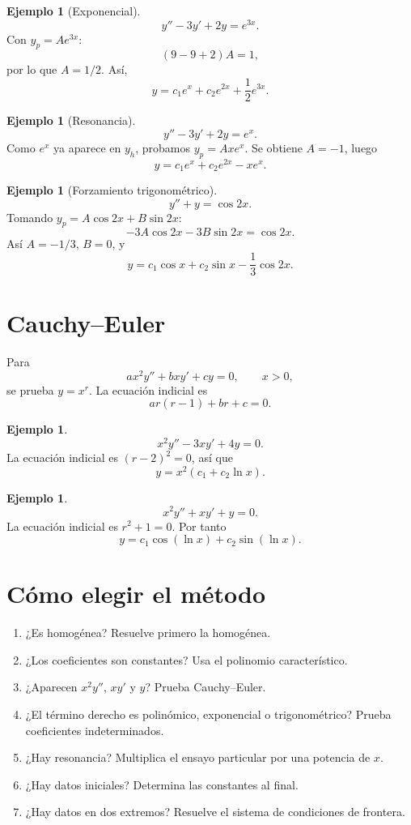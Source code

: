 \documentclass[11pt]{article}
\theoremstyle{definition}
\newtheorem{ejemplo}[teorema]{Ejemplo}
\begin{document}
\begin{ejemplo}[Exponencial]
\[
y''-3y'+2y=e^{3x}.
\]
Con $y_p=Ae^{3x}$:
\[
(9-9+2)A=1,
\]
por lo que $A=1/2$. Así,
\[
\boxed{y=c_1e^x+c_2e^{2x}+\frac12e^{3x}}.
\]
\end{ejemplo}

\begin{ejemplo}[Resonancia]
\[
y''-3y'+2y=e^x.
\]
Como $e^x$ ya aparece en $y_h$, probamos $y_p=Axe^x$. Se obtiene $A=-1$, luego
\[
\boxed{y=c_1e^x+c_2e^{2x}-xe^x}.
\]
\end{ejemplo}

\begin{ejemplo}[Forzamiento trigonométrico]
\[
y''+y=\cos2x.
\]
Tomando $y_p=A\cos2x+B\sin2x$:
\[
-3A\cos2x-3B\sin2x=\cos2x.
\]
Así $A=-1/3$, $B=0$, y
\[
\boxed{y=c_1\cos x+c_2\sin x-\frac13\cos2x}.
\]
\end{ejemplo}

\section{Cauchy--Euler}
Para
\[
ax^2y''+bxy'+cy=0,\qquad x>0,
\]
se prueba $y=x^r$. La ecuación indicial es
\[
ar(r-1)+br+c=0.
\]

\begin{ejemplo}
\[
x^2y''-3xy'+4y=0.
\]
La ecuación indicial es $(r-2)^2=0$, así que
\[
\boxed{y=x^2(c_1+c_2\ln x)}.
\]
\end{ejemplo}

\begin{ejemplo}
\[
x^2y''+xy'+y=0.
\]
La ecuación indicial es $r^2+1=0$. Por tanto
\[
\boxed{y=c_1\cos(\ln x)+c_2\sin(\ln x)}.
\]
\end{ejemplo}

\section{Cómo elegir el método}
\begin{enumerate}
\item ¿Es homogénea? Resuelve primero la homogénea.
\item ¿Los coeficientes son constantes? Usa el polinomio característico.
\item ¿Aparecen $x^2y''$, $xy'$ y $y$? Prueba Cauchy--Euler.
\item ¿El término derecho es polinómico, exponencial o trigonométrico? Prueba coeficientes indeterminados.
\item ¿Hay resonancia? Multiplica el ensayo particular por una potencia de $x$.
\item ¿Hay datos iniciales? Determina las constantes al final.
\item ¿Hay datos en dos extremos? Resuelve el sistema de condiciones de frontera.
\end{enumerate}
\end{document}
